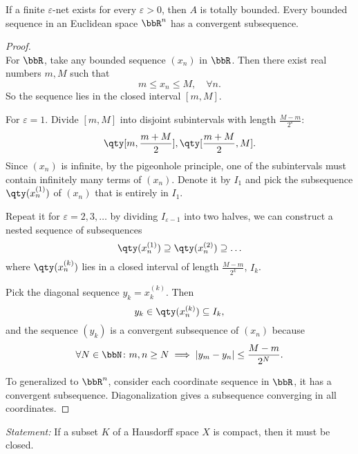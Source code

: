 \documentclass[a4paper,12pt]{article}
\begin{document}
If a finite $\varepsilon$-net exists for every $\varepsilon>0$, then $A$ is totally bounded.
Every bounded sequence in an Euclidean space $\bbR^n$ has a convergent subsequence.

\begin{proof}\mbox{}\\
    For $\bbR$, take any bounded sequence $(x_n)$ in $\bbR$. Then there exist real numbers $m,M$ such that
    \[m\leq x_n\leq M,\quad\forall n.\]
    So the sequence lies in the closed interval $[m,M]$.

    For $\varepsilon=1$. Divide $[m,M]$ into disjoint subintervals with length $\frac{M-m}{2^\varepsilon}$:
    \[\qty[m,\frac{m+M}{2}],\qty[\frac{m+M}{2},M].\]
    Since $(x_n)$ is infinite, by the pigeonhole principle, one of the subintervals must contain infinitely many terms of $(x_n)$. Denote it by $I_1$ and pick the subsequence $\qty(x_n^{(1)})$ of $(x_n)$ that is entirely in $I_1$.

    Repeat it for $\varepsilon=2,3,\ldots$ by dividing $I_{\varepsilon-1}$ into two halves, we can construct a nested sequence of subsequences
    \[\qty(x_n^{(1)})\supseteq \qty(x_n^{(2)})\supseteq\ldots\]
    where $\qty(x_n^{(k)})$ lies in a closed interval of length $\frac{M-m}{2^k}$, $I_k$.

    Pick the diagonal sequence $y_k=x_k^(k)$. Then
    \[y_k\in\qty(x_n^{(k)})\subseteq I_k,\]
    and the sequence $(y_k)$ is a convergent subsequence of $(x_n)$ because
    \[\forall N\in\bbN\colon m,n\geq N\implies |y_m-y_n|\leq\frac{M-m}{2^N}.\]

    To generalized to $\bbR^n$, consider each coordinate sequence in $\bbR$, it has a convergent subsequence. Diagonalization gives a subsequence converging in all coordinates.
\end{proof}
\textit{Statement:} If a subset $K$ of a Hausdorff space $X$ is compact, then it must be closed.
\end{document}
